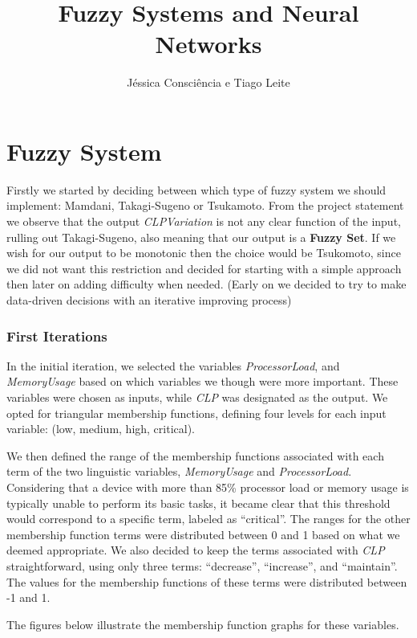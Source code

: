 \documentclass[11pt]{report}
\title{Fuzzy Systems and Neural Networks}
\author{Jéssica Consciência e Tiago Leite}
\begin{document}
\maketitle
\newpage


\part{Fuzzy System}

Firstly we started by deciding between which type of fuzzy system
we should implement: Mamdani, Takagi-Sugeno or Tsukamoto. From the
project statement we observe that the output \textit{CLPVariation}
is not any clear function of the input, rulling out Takagi-Sugeno,
also meaning that our output is a \textbf{Fuzzy Set}. If we wish for
our output to be monotonic then the choice would be Tsukomoto, since
we did not want this restriction and decided for starting with a simple
approach then later on adding difficulty when needed.
(Early on we decided to try to make data-driven decisions with an iterative
improving process)

\section{First Iterations}

In the initial iteration, we selected the variables \textit{ProcessorLoad}, and \textit{MemoryUsage} based on which variables we though were more important.
These variables were chosen as inputs, while \textit{CLP} was designated as the output.
We opted for triangular membership functions, defining four levels for each input variable: (low, medium, high, critical).

We then defined the range of the membership functions associated with each term of the two linguistic variables, \textit{MemoryUsage} and \textit{ProcessorLoad}. Considering that a device with more than 85\% processor load or memory usage is typically unable to perform its basic tasks,
it became clear that this threshold would correspond to a specific term, labeled as ``critical''. The ranges for the other membership function terms were distributed between 0 and 1 based on what we deemed appropriate.
We also decided to keep the terms associated with \textit{CLP} straightforward, using only three terms: ``decrease'', ``increase'', and ``maintain''.
The values for the membership functions of these terms were distributed between -1 and 1.

The figures below illustrate the membership function graphs for these variables.
\end{document}
